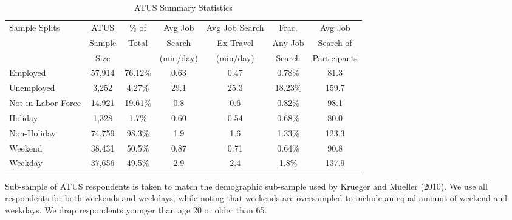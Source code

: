 \documentclass[12pt]{article}
\begin{document}
\begin{spacing}{2}
\begin{appendix}
\begin{sidewaystable}[!htpb]
\caption{ATUS Summary Statistics}
\label{tab:atussumm}
\centering
\begin{threeparttable}
\begin{tabular}{lcccccc}
\hline
 Sample Splits&ATUS         & \% of  & Avg Job     & Avg Job Search  & Frac. & Avg Job   \\
  & Sample      & Total  & Search      &   Ex-Travel     & Any Job & Search of   \\
 &  Size       &        & (min/day)   &   (min/day)     &   Search   &  Participants  \\
\hline
Employed &57,914   & 76.12\%  & 0.63  & 0.47 & 0.78\%  & 81.3  \\
Unemployed &3,252   &  4.27\% & 29.1 &  25.3 & 18.23\% & 159.7  \\
Not in Labor Force & 14,921  & 19.61\%   & 0.8  & 0.6 & 0.82\%  & 98.1 \\
\hline
Holiday& 1,328& 1.7\% & 0.60 & 0.54 & 0.68\% & 80.0 \\
Non-Holiday& 74,759& 98.3\% & 1.9 & 1.6 & 1.33\% & 123.3 \\
\hline
Weekend&38,431& 50.5\% & 0.87 & 0.71 & 0.64\% & 90.8 \\
Weekday& 37,656& 49.5\% & 2.9 & 2.4 & 1.8\% & 137.9 \\
\hline
\end{tabular}
\begin{tablenotes}
\item  Sub-sample of ATUS respondents is taken to match the demographic sub-sample used by Krueger and Mueller (2010). We use all respondents for both weekends and weekdays, while noting that weekends are oversampled to include an equal amount of weekend and weekdays. We drop respondents younger than age 20 or older than 65.
\end{tablenotes}
\end{threeparttable}
\end{sidewaystable}


\end{appendix}

\end{spacing}
\end{document}
